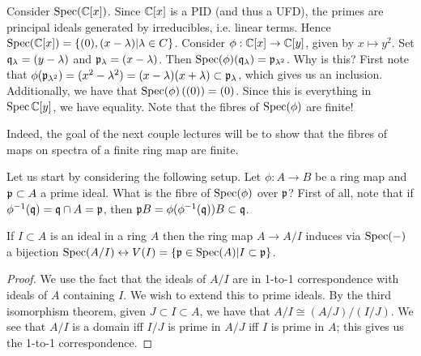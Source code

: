 \documentclass{../mathnotes}
\begin{document}
\begin{exmp}
    Consider $\operatorname{Spec}(\mathbb{C}[x])$. Since $\mathbb{C}[x]$ is a PID (and thus a UFD), the primes are principal ideals generated by irreducibles, i.e.
    linear terms. Hence $\operatorname{Spec}(\mathbb{C}[x])=\left\{ (0),(x-\lambda) | \lambda\in C \right\}$. Consider $\phi:\mathbb{C}[x]\to\mathbb{C}[y]$, given by $x\mapsto y^2$.
    Set $\mathfrak q_\lambda=(y-\lambda)$ and $\mathfrak p_\lambda=(x-\lambda)$. Then $\operatorname{Spec}(\phi)(\mathfrak q_\lambda)=\mathfrak p_{\lambda^2}$. Why is this? 
    First note that $\phi(\mathfrak p_{\lambda^2})=(x^2-\lambda^2)=(x-\lambda)(x+\lambda)\subset\mathfrak p_\lambda$, which gives us an inclusion.
    Additionally, we have that $\operatorname{Spec}(\phi)\left( (0) \right)=(0)$. Since this is everything in $\operatorname{Spec}\mathbb{C}[y]$, we have equality.  Note that the fibres of $\operatorname{Spec}(\phi)$ are finite!
\end{exmp}

Indeed, the goal of the next couple lectures will be to show that the fibres of maps on spectra of a finite ring map are finite.

Let us start by considering the following setup. Let $\phi: A\to B$ be a ring map and $\mathfrak p\subset A$ a prime ideal. What is the fibre of $\operatorname{Spec}(\phi)$ over $\mathfrak p$? First of all, note that if $\phi^{-1}(\mathfrak q)=\mathfrak q\cap A=\mathfrak p$, then $\mathfrak p B=\phi(\phi^{-1}(\mathfrak q))B\subset\mathfrak q$.

\begin{lem}
\label{L5}
    If $I\subset A$ is an ideal in a ring $A$ then the ring map $A\to A/I$ induces via $\operatorname{Spec}(-)$ a bijection $\operatorname{Spec}(A/I)\leftrightarrow V(I)=\left\{ \mathfrak p\in\operatorname{Spec}(A) | I\subset \mathfrak p \right\}$.
\end{lem}
\begin{proof}
    We use the fact that the ideals of $A/I$ are in 1-to-1 correspondence with ideals of $A$ containing $I$. We wish to extend this to prime ideals. By the third isomorphism theorem, given $J\subset I\subset A$, we have that $A/I\cong(A/J)/(I/J)$. We see that $A/I$ is a domain iff $I/J$ is prime in $A/J$ iff $I$ is prime in $A$; this gives us the 1-to-1 correspondence.
\end{proof}
\end{document}
